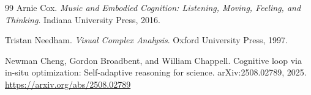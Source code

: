 \documentclass[11pt, a4paper]{article}
\begin{document}
\begin{thebibliography}{99}
Arnie Cox.
\newblock \emph{Music and Embodied Cognition: Listening, Moving, Feeling, and
  Thinking}.
\newblock Indiana University Press, 2016.

Tristan Needham.
\newblock \emph{Visual Complex Analysis}.
\newblock Oxford University Press, 1997.

Newman Cheng, Gordon Broadbent, and William Chappell.
\newblock Cognitive loop via in-situ optimization: Self-adaptive reasoning for
  science.
\newblock arXiv:2508.02789, 2025.
\newblock \url{https://arxiv.org/abs/2508.02789}

\end{thebibliography}
\end{document}

